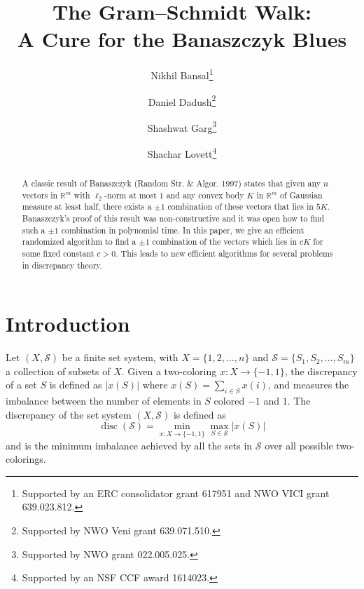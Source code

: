 \documentclass{toc}
\DeclareMathOperator{\disc}{disc}   %
\begin{document}
\begin{frontmatter}[classification=text]
  
%
%

%
%

\title{The Gram--Schmidt Walk:\\ A Cure for the Banaszczyk Blues}

%
%
%
%
%
%
%
%
%
%
%
%


%
%
%
%

%

\author[bansal]{Nikhil Bansal\thanks{Supported by an ERC consolidator grant 617951 and NWO VICI grant  639.023.812.
}}
\author[dadush]{Daniel Dadush\thanks{Supported by NWO Veni grant 639.071.510.}}
\author[garg]{Shashwat Garg\thanks{Supported by NWO grant 022.005.025.}}
\author[lovett]{Shachar Lovett\thanks{Supported by an NSF CCF award 1614023.}}

%
%
%
%

%
%
%
%
%
%
\begin{abstract}
A classic result of Banaszczyk
%
(Random Str. \& Algor. 1997)  %
states that given any $n$ vectors in $\mathbb{R}^m$ with $\ell_2$-norm at most $1$ and any convex body $K$ in $\mathbb{R}^m$ of Gaussian measure at least half, there exists a $\pm 1$ combination of these vectors that lies in $5K$.
%
Banaszczyk's proof of this result was non-constructive and it was open how to find such a $\pm 1$ combination in polynomial time.
In this paper, we give an efficient randomized algorithm to find a $\pm 1$ combination of the vectors which lies in $cK$ for some fixed constant $c>0$.
This leads to new efficient algorithms for several problems in discrepancy theory.
\end{abstract}

%

\end{frontmatter}

%
%
%
\allowdisplaybreaks
\section{Introduction}
Let $(X,\mathcal{S})$ be a finite set system, with $X=\{1,2,\dots,n\}$ and $\mathcal{S}=\{S_1,S_2,\dots,S_m\}$ a collection of subsets of $X$. Given a two-coloring $x:X\rightarrow \{-1,1\}$, the discrepancy of a set $S$ is defined as $|x(S)|$ where $x(S) = \sum_{i\in S} x(i)$, and measures the imbalance between the number of elements in $S$ colored $-1$ and $1$. The discrepancy of the set system $(X,\mathcal{S})$ is defined as
\[ \disc(\mathcal{S}) = \min_{x:X\rightarrow \{-1,1\}} \max_{S\in\mathcal{S}} |x(S)| \]
and is the minimum imbalance achieved by all the sets in $\mathcal{S}$ over all possible two-colorings.
\end{document}

